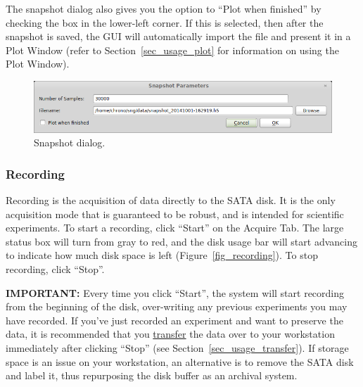The snapshot dialog also gives you the option to ``Plot when finished'' by checking the box in the lower-left corner. If this is selected, then after the snapshot is saved, the GUI will automatically import the file and present it in a Plot Window (refer to Section~\ref{sec_usage_plot} for information on using the Plot Window).

\begin{figure}[h!]
\begin{center}
\includegraphics[width=14cm]{screenshots/snapshotdialog.png}
\end{center}
\caption{Snapshot dialog.}
\label{fig_snapshotdialog}
\end{figure}

\subsubsection{Recording}
\label{sec_usage_acquire_recording}

Recording is the acquisition of data directly to the SATA disk. It is the only acquisition mode that is guaranteed to be robust, and is intended for scientific experiments. To start a recording, click ``Start'' on the Acquire Tab. The large status box will turn from gray to red, and the disk usage bar will start advancing to indicate how much disk space is left (Figure~\ref{fig_recording}). To stop recording, click ``Stop''.

\vspace{5mm}
\noindent \textbf{IMPORTANT:} Every time you click ``Start'', the system will start recording from the beginning of the disk, over-writing any previous experiments you may have recorded. If you've just recorded an experiment and want to preserve the data, it is recommended that you \underline{transfer} the data over to your workstation immediately after clicking ``Stop'' (see Section~\ref{sec_usage_transfer}). If storage space is an issue on your workstation, an alternative is to remove the SATA disk and label it, thus repurposing the disk buffer as an archival system.

